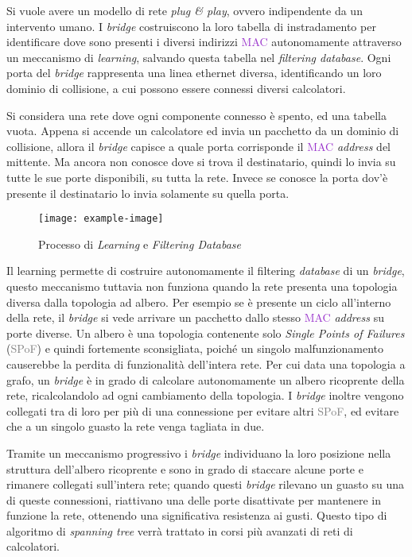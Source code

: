 \documentclass{article}
\numberwithin{equation}{subsection}
\begin{document}
Si vuole avere un modello di rete \textit{plug \& play}, ovvero indipendente da un intervento umano. 
I \textit{bridge} costruiscono la loro tabella di instradamento per identificare dove sono presenti i diversi indirizzi \textcolor{DarkOrchid}{MAC} autonomamente attraverso un meccanismo di \textit{learning}, 
salvando questa tabella nel \textit{filtering \textit{database}}. Ogni porta del \textit{bridge} rappresenta una linea ethernet diversa, identificando un loro dominio di collisione, a cui 
possono essere connessi diversi calcolatori. 

Si considera una rete dove ogni componente connesso è spento, ed una tabella vuota. Appena si accende un calcolatore ed invia un pacchetto da un dominio di collisione, 
allora il \textit{bridge} capisce a quale porta corrisponde il \textcolor{DarkOrchid}{MAC} \textit{address} del mittente. Ma ancora non conosce dove si trova il destinatario, quindi lo invia su tutte le sue 
porte disponibili, su tutta la rete. Invece se conosce la porta dov'è presente il destinatario lo invia solamente su quella porta. 

\begin{figure}[H]%
    \centering%
    \texttt{[image: example-image]}%
    \caption{Processo di \textit{Learning} e \textit{Filtering Database}}%
\end{figure}

Il learning permette di costruire autonomamente il filtering \textit{database} di un \textit{bridge}, questo meccanismo tuttavia non funziona quando la rete presenta una topologia diversa 
dalla topologia ad albero. Per esempio se è presente un ciclo all'interno della rete, il \textit{bridge} si vede arrivare un pacchetto dallo stesso \textcolor{DarkOrchid}{MAC} \textit{address} su porte diverse. 
Un albero è una topologia contenente solo \textit{Single Points of Failures} (\textcolor{gray}{SPoF}) e quindi fortemente sconsigliata, poiché un singolo malfunzionamento causerebbe la 
perdita di funzionalità dell'intera rete. Per cui data una topologia a grafo, un \textit{bridge} è in grado di calcolare autonomamente un albero 
ricoprente della rete, ricalcolandolo ad ogni cambiamento della topologia. I \textit{bridge} inoltre vengono collegati tra di loro per più di una connessione per evitare altri \textcolor{gray}{SPoF}, ed 
evitare che a un singolo guasto la rete venga tagliata in due. 

Tramite un meccanismo progressivo i \textit{bridge} individuano la loro posizione nella struttura dell'albero ricoprente e sono in grado di staccare alcune porte e rimanere 
collegati sull'intera rete; quando questi \textit{bridge} rilevano un guasto su una di queste connessioni, riattivano una delle porte disattivate per mantenere in funzione la 
rete, ottenendo una significativa resistenza ai gusti. 
Questo tipo di algoritmo di \textit{spanning tree} verrà trattato in corsi più avanzati di reti di calcolatori. 
\end{document}
